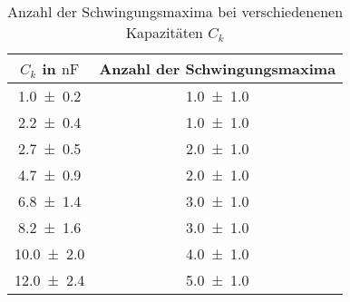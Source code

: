\begin{table}
\centering
\caption{ Anzahl der Schwingungsmaxima bei verschiedenenen Kapazitäten $C_k$}
\label{teila_n_ck}
\begin{tabular}{S S }
\toprule
{$C_k$ in $\si{\nano\farad}$} & {Anzahl der Schwingungsmaxima}  \\ 
\midrule
 \num{1.0\pm0.2} & \num{1.0\pm1.0}\\
\num{2.2\pm0.4} & \num{1.0\pm1.0}\\
\num{2.7\pm0.5} & \num{2.0\pm1.0}\\
\num{4.7\pm0.9} & \num{2.0\pm1.0}\\
\num{6.8\pm1.4} & \num{3.0\pm1.0}\\
\num{8.2\pm1.6} & \num{3.0\pm1.0}\\
\num{10.0\pm2.0} & \num{4.0\pm1.0}\\
\num{12.0\pm2.4} & \num{5.0\pm1.0}\\
\bottomrule
\end{tabular}
\end{table}
